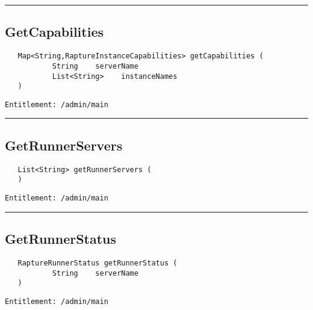 \rule{12cm}{2pt}
\subsection{GetCapabilities}
\label{Api:GetCapabilities}
\begin{Verbatim}
   Map<String,RaptureInstanceCapabilities> getCapabilities (
           String    serverName
           List<String>    instanceNames
   )
\end{Verbatim}
\begin{Verbatim}[formatcom=\color{Maroon}]
  Entitlement: /admin/main
\end{Verbatim}



\rule{12cm}{2pt}
\subsection{GetRunnerServers}
\label{Api:GetRunnerServers}
\begin{Verbatim}
   List<String> getRunnerServers (
   )
\end{Verbatim}
\begin{Verbatim}[formatcom=\color{Maroon}]
  Entitlement: /admin/main
\end{Verbatim}



\rule{12cm}{2pt}
\subsection{GetRunnerStatus}
\label{Api:GetRunnerStatus}
\begin{Verbatim}
   RaptureRunnerStatus getRunnerStatus (
           String    serverName
   )
\end{Verbatim}
\begin{Verbatim}[formatcom=\color{Maroon}]
  Entitlement: /admin/main
\end{Verbatim}



